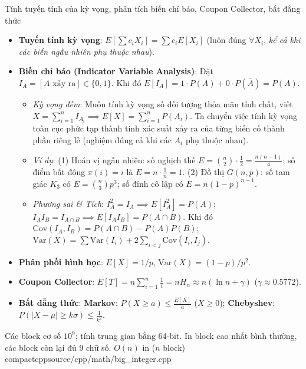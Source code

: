 {Tính tuyến tính của kỳ vọng, phân tích biến chỉ báo, Coupon Collector, bất đẳng thức}
{}
{}{}

\begin{itemize}
    \setlength{\itemsep}{0pt}
    \setlength{\parsep}{0pt}
    \item \textbf{Tuyến tính kỳ vọng}: $E[\sum c_i X_i] = \sum c_i E[X_i]$ (luôn đúng $\forall X_i$, \emph{kể cả khi các biến ngẫu nhiên phụ thuộc nhau}).
    \item \textbf{Biến chỉ báo (Indicator Variable Analysis)}: Đặt $I_A = [A\text{ xảy ra}] \in \{0, 1\}$.
    Khi đó $E[I_A] = 1\cdot P(A) + 0\cdot P(\overline{A}) = P(A)$.
    \begin{itemize}
        \setlength{\itemsep}{0pt}
        \setlength{\parsep}{0pt}
        \item \emph{Kỳ vọng đếm}: Muốn tính kỳ vọng số đối tượng thỏa mãn tính chất, viết $X = \sum_{i=1}^n I_{A_i} \implies E[X] = \sum_{i=1}^n P(A_i)$. Ta chuyển việc tính kỳ vọng toàn cục phức tạp thành tính xác suất xảy ra của từng biến cố thành phần riêng lẻ (nghiệm đúng cả khi các $A_i$ phụ thuộc nhau).
        \item \emph{Ví dụ}: (1) Hoán vị ngẫu nhiên: số nghịch thế $E = \binom{n}{2} \cdot \frac{1}{2} = \frac{n(n-1)}{4}$; số điểm bất động $\pi(i)=i$ là $E = n \cdot \frac{1}{n} = 1$. (2) Đồ thị $G(n, p)$: số tam giác $K_3$ có $E = \binom{n}{3}p^3$; số đỉnh cô lập có $E = n(1-p)^{n-1}$.
        \item \emph{Phương sai \& Tích}: $I_A^2 = I_A \implies E[I_A^2] = P(A)$; $I_A I_B = I_{A \cap B} \implies E[I_A I_B] = P(A \cap B)$. Khi đó $\text{Cov}(I_A, I_B) = P(A \cap B) - P(A)P(B)$; $\text{Var}(X) = \sum \text{Var}(I_i) + 2\sum_{i<j} \text{Cov}(I_i, I_j)$.
    \end{itemize}
    \item \textbf{Phân phối hình học}: $E[X] = 1/p$, $\text{Var}(X) = (1-p)/p^2$.
    \item \textbf{Coupon Collector}: $E[T] = n \sum_{i=1}^n \frac{1}{i} = n H_n \approx n(\ln n + \gamma)$ ($\gamma \approx 0.5772$).
    \item \textbf{Bất đẳng thức}: \textbf{Markov}: $P(X \ge a) \le \frac{E[X]}{a}$ ($X \ge 0$); \textbf{Chebyshev}: $P(|X - \mu| \ge k\sigma) \le \frac{1}{k^2}$.
\end{itemize}

{Các block cơ số $10^9$; tính trung gian bằng 64-bit. In block cao nhất bình thường, các block còn lại đủ 9 chữ số.}
{$O(n)$ in ($n$ block)}
{compactcpp}{source/cpp/math/big_integer.cpp}
